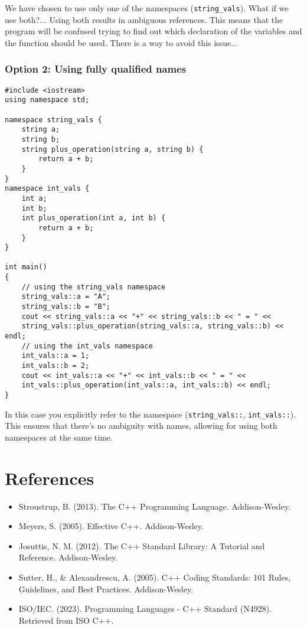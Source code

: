 \documentclass{article}
\begin{document}
We have chosen to use only one of the namespaces (\verb|string_vals|). What if we use both?... Using both results in ambiguous references. This means that the program will be confused trying to find out which declaration of the variables and the function should be used. There is a way to avoid this issue...

\subsubsection*{Option 2: Using fully qualified names}
\begin{verbatim}
#include <iostream>
using namespace std;

namespace string_vals {
    string a; 
    string b;  
    string plus_operation(string a, string b) {
        return a + b;
    }
}
namespace int_vals {
    int a; 
    int b; 
    int plus_operation(int a, int b) {
        return a + b;
    }
}

int main()
{
    // using the string_vals namespace
    string_vals::a = "A";
    string_vals::b = "B";
    cout << string_vals::a << "+" << string_vals::b << " = " <<
    string_vals::plus_operation(string_vals::a, string_vals::b) << endl; 
    // using the int_vals namespace
    int_vals::a = 1;
    int_vals::b = 2;
    cout << int_vals::a << "+" << int_vals::b << " = " <<
    int_vals::plus_operation(int_vals::a, int_vals::b) << endl; 
}
\end{verbatim}

In this case you explicitly refer to the namespace (\verb|string_vals::|, \verb|int_vals::|). This ensures that there's no ambiguity with names, allowing for using both namespaces at the same time.

\section*{References}

\begin{itemize}
    \item Stroustrup, B. (2013). The C++ Programming Language. Addison-Wesley.
    \item Meyers, S. (2005). Effective C++. Addison-Wesley.
    \item Josuttis, N. M. (2012). The C++ Standard Library: A Tutorial and Reference. Addison-Wesley.
    \item Sutter, H., \& Alexandrescu, A. (2005). C++ Coding Standards: 101 Rules, Guidelines, and Best Practices. Addison-Wesley.
    \item ISO/IEC. (2023). Programming Languages - C++ Standard (N4928). Retrieved from ISO C++.
\end{itemize}
\end{document}
